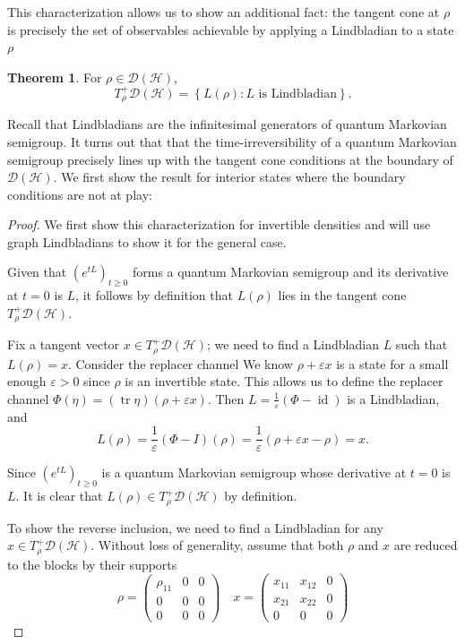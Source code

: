 \documentclass[11pt,reqno]{amsart}
\theoremstyle{definition}
\newtheorem{theorem}{Theorem}[section]
\newcommand{\mc}{\mathcal}
\newcommand{\lset}{\left\{ }
\newcommand{\rset}{\right\} }
\DeclareMathOperator{\tr}{tr}
\DeclareMathOperator{\id}{id}
\begin{document}
This characterization allows us to show an additional fact: the tangent cone at $\rho$ is precisely the set of observables achievable by applying a Lindbladian to a state $\rho$
\begin{theorem}\label{lind_tangent}
    For $\rho\in \mc D(\mc{H})$,
    $$T_\rho^+\mc D(\mc{H})=\lset L(\rho):L\text{ is Lindbladian}\rset.$$
\end{theorem}
Recall that Lindbladians are the infinitesimal generators of quantum Markovian semigroup. It turns out that that the time-irreversibility of a quantum Markovian semigroup precisely lines up with the tangent cone conditions at the boundary of $\mc D(\mc{H})$. We first show the result for interior states where the boundary conditions are not at play:


\begin{proof}
    We first show this characterization for invertible densities and will use graph Lindbladians to show it for the general case.

    Given that $(e^{tL})_{t\geq 0}$ forms a quantum Markovian semigroup and its derivative at $t=0$ is $L$, it follows by definition that $L(\rho)$ lies in the tangent cone $T_\rho^+ \mc D(\mc{H})$.

    Fix a tangent vector $x\in T_\rho^+\mc D(\mc{H})$; we need to find a Lindbladian $L$ such that $L(\rho)=x$.
    Consider the replacer channel We know $\rho+\varepsilon x$ is a state for a small enough $\varepsilon>0$ since $\rho$ is an invertible state. This allows us to define the replacer channel $\Phi(\eta)=(\tr\eta)(\rho+\varepsilon x)$. 
    Then $L=\frac{1}{\varepsilon}(\Phi-\id)$ is a Lindbladian, and $$L(\rho)=\frac{1}{\varepsilon}(\Phi-I)(\rho)=\frac{1}{\varepsilon}(\rho+\varepsilon x-\rho)=x.$$
    
    Since $(e^{tL})_{t\geq 0}$ is a quantum Markovian semigroup whose derivative at $t=0$ is $L$. It is clear that $L(\rho)\in T_\rho^+\mc D(\mc{H})$ by definition.

    To show the reverse inclusion, we need to find a Lindbladian for any $x\in T_\rho^+\mc D(\mc{H})$.
    Without loss of generality, assume that both $\rho$ and $x$ are reduced to the blocks by their supports $$\rho=\begin{pmatrix}
        \rho_{11} & 0 & 0\\
        0 & 0 & 0\\
        0 & 0 & 0
    \end{pmatrix}\quad x=\begin{pmatrix}
        x_{11} & x_{12} & 0\\
        x_{21} & x_{22} & 0\\
        0 & 0 & 0
    \end{pmatrix}$$


\end{proof}
\end{document}
